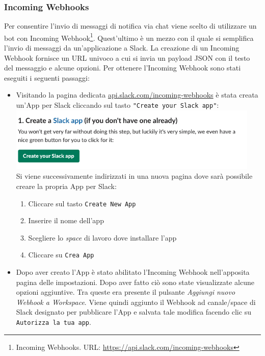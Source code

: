\subsubsection{Incoming Webhooks}
Per consentire l'invio di messaggi di notifica via chat viene scelto di utilizzare un bot con Incoming Webhook\footnote{Incoming Webhooks. URL: \href{https://api.slack.com/incoming-webhooks}{https://api.slack.com/incoming-webhooks}}. Quest'ultimo è un mezzo con il quale si semplifica l'invio di messaggi da un'applicazione a Slack. La creazione di un Incoming Webhook fornisce un URL univoco a cui si invia un payload JSON con il testo del messaggio e alcune opzioni.
Per ottenere l'Incoming Webhook sono stati eseguiti i seguenti passaggi:
\begin{itemize}
    \item Visitando la pagina dedicata \href{https://api.slack.com/incoming-webhooks}{api.slack.com/incoming-webhooks} è stata creata un'App per Slack cliccando sul tasto \texttt{"Create your Slack app"}:\\
    \includegraphics[width=12cm]{immagini/slack_bot.png}\\
    Si viene successivamente indirizzati in una nuova pagina dove sarà possibile creare la propria App per Slack:
	\begin{enumerate}
		\item Cliccare sul tasto \texttt{Create New App}
		\item Inserire il nome dell'app
		\item Scegliere lo \textit{space} di lavoro dove installare l'app
		\item Cliccare su \texttt{Crea App}
	\end{enumerate}
	\item Dopo aver creato l'App è stato abilitato l'Incoming Webhook nell'apposita pagina delle impostazioni. Dopo aver fatto ciò sono state visualizzate alcune opzioni aggiuntive. Tra queste era presente il pulsante \textit{Aggiungi nuovo Webhook a Workspace}. Viene quindi aggiunto il Webhook ad canale/space di Slack designato per pubblicare l'App e salvata tale modifica facendo clic su \texttt{Autorizza la tua app}.
\end{itemize} 
